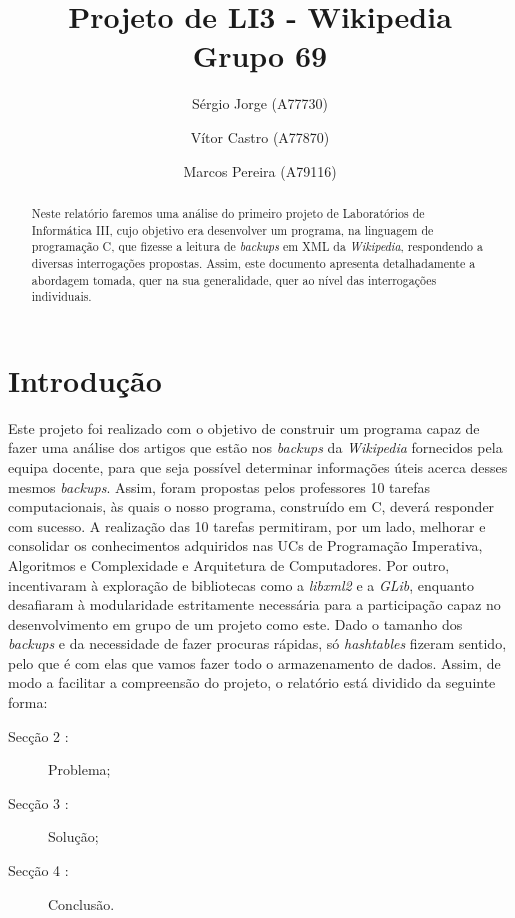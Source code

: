 \documentclass[a4paper]{article}
\title{Projeto de LI3 - Wikipedia\\Grupo 69}
\author{Sérgio Jorge (A77730) \and Vítor Castro (A77870) \and Marcos Pereira (A79116)}
\date{}
\begin{document}
\maketitle

\begin{abstract}
Neste relatório faremos uma análise do primeiro projeto de Laboratórios de Informática III, cujo objetivo era desenvolver um programa, na linguagem de programação C, que fizesse a leitura de \textit{backups} em XML da \textit{Wikipedia}, respondendo a diversas interrogações propostas. Assim, este documento apresenta detalhadamente a abordagem tomada, quer na sua generalidade, quer ao nível das interrogações individuais.
\end{abstract}

\tableofcontents

\section{Introdução}
\label{sec:intro}
Este projeto foi realizado com o objetivo de construir um programa capaz de fazer uma análise dos artigos que estão nos \textit{backups} da \textit{Wikipedia} fornecidos pela equipa docente, para que seja possível determinar informações úteis acerca desses mesmos \textit{backups}.
Assim, foram propostas pelos professores 10 tarefas computacionais, às quais o nosso programa, construído em C, deverá responder com sucesso. A realização das 10 tarefas permitiram, por um lado, melhorar e consolidar os conhecimentos adquiridos nas UCs de Programação Imperativa, Algoritmos e Complexidade e Arquitetura de Computadores. Por outro, incentivaram à exploração de bibliotecas como a \textit{libxml2} e a \textit{GLib}, enquanto desafiaram à modularidade estritamente necessária para a participação capaz no desenvolvimento em grupo de um projeto como este.
Dado o tamanho dos \textit{backups} e da necessidade de fazer procuras rápidas, só \textit{hashtables} fizeram sentido, pelo que é com elas que vamos fazer todo o armazenamento de dados.
Assim, de modo a facilitar a compreensão do projeto, o relatório está dividido da seguinte forma:
\begin{description}
    \item[Secção 2 :] Problema;
    \item[Secção 3 :] Solução;
    \item[Secção 4 :] Conclusão.
\end{description}
\end{document}
